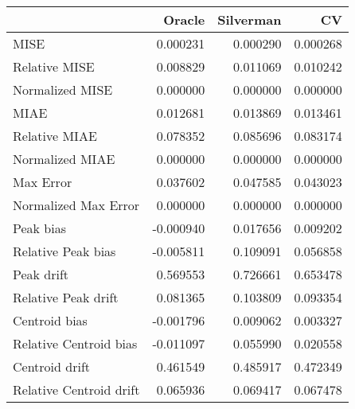 \begin{tabular}{lrrr}
  \hline
 & Oracle & Silverman & CV \\ 
  \hline
MISE & 0.000231 & 0.000290 & 0.000268 \\ 
  Relative MISE & 0.008829 & 0.011069 & 0.010242 \\ 
  Normalized MISE & 0.000000 & 0.000000 & 0.000000 \\ 
  MIAE & 0.012681 & 0.013869 & 0.013461 \\ 
  Relative MIAE & 0.078352 & 0.085696 & 0.083174 \\ 
  Normalized MIAE & 0.000000 & 0.000000 & 0.000000 \\ 
  Max Error & 0.037602 & 0.047585 & 0.043023 \\ 
  Normalized Max Error & 0.000000 & 0.000000 & 0.000000 \\ 
  Peak bias & -0.000940 & 0.017656 & 0.009202 \\ 
  Relative Peak bias & -0.005811 & 0.109091 & 0.056858 \\ 
  Peak drift & 0.569553 & 0.726661 & 0.653478 \\ 
  Relative Peak drift & 0.081365 & 0.103809 & 0.093354 \\ 
  Centroid bias & -0.001796 & 0.009062 & 0.003327 \\ 
  Relative Centroid bias & -0.011097 & 0.055990 & 0.020558 \\ 
  Centroid drift & 0.461549 & 0.485917 & 0.472349 \\ 
  Relative Centroid drift & 0.065936 & 0.069417 & 0.067478 \\ 
   \hline
\end{tabular}
